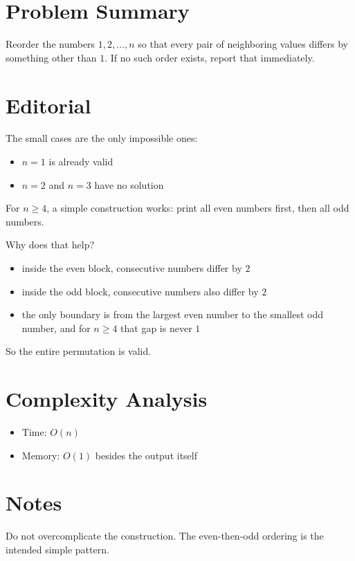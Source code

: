 \section{Problem Summary}
Reorder the numbers \(1, 2, \ldots, n\) so that every pair of neighboring values differs by something other than \(1\). If no such order exists, report that immediately.

\section{Editorial}
The small cases are the only impossible ones:
\begin{itemize}
\item \(n = 1\) is already valid
\item \(n = 2\) and \(n = 3\) have no solution
\end{itemize}

For \(n \ge 4\), a simple construction works: print all even numbers first, then all odd numbers.

Why does that help?
\begin{itemize}
\item inside the even block, consecutive numbers differ by \(2\)
\item inside the odd block, consecutive numbers also differ by \(2\)
\item the only boundary is from the largest even number to the smallest odd number, and for \(n \ge 4\) that gap is never \(1\)
\end{itemize}

So the entire permutation is valid.

\section{Complexity Analysis}
\begin{itemize}
\item Time: \(O(n)\)
\item Memory: \(O(1)\) besides the output itself
\end{itemize}

\section{Notes}
Do not overcomplicate the construction. The even-then-odd ordering is the intended simple pattern.
